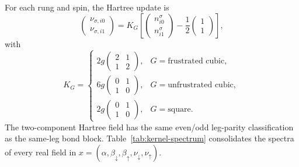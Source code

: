 \documentclass[11pt]{article}
\begin{document}
For each rung and spin, the Hartree update is
\begin{equation}
 \begin{pmatrix}\nu_{\sigma,i0}\\\nu_{\sigma,i1}\end{pmatrix}
 =K_G\left[
 \begin{pmatrix}n^\sigma_{i0}\\n^\sigma_{i1}\end{pmatrix}
 -\frac12\begin{pmatrix}1\\1\end{pmatrix}\right],
\label{eq:density-kernel}
\end{equation}
with
\begin{equation}
 K_G=
 \begin{cases}
  2g\left(\begin{smallmatrix}2&1\\1&2\end{smallmatrix}\right),
    &G=\text{frustrated cubic},\\[2pt]
  6g\left(\begin{smallmatrix}0&1\\1&0\end{smallmatrix}\right),
    &G=\text{unfrustrated cubic},\\[2pt]
  2g\left(\begin{smallmatrix}0&1\\1&0\end{smallmatrix}\right),
    &G=\text{square}.
 \end{cases}
\end{equation}
The two-component Hartree field has the same even/odd leg-parity
classification as the same-leg bond block.  Table~\ref{tab:kernel-spectrum}
consolidates the spectra of every real field in
\(x=(\alpha,\beta_\downarrow,\beta_\uparrow,\nu_\downarrow,\nu_\uparrow)\).
\end{document}
